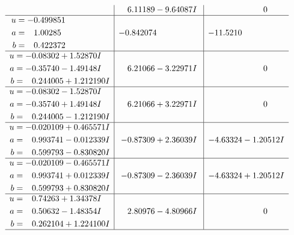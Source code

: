 \documentclass[1p]{elsarticle_modified}
\theoremstyle{definition}
\begin{document}
$$\begin{array}{c|c|c}
 & \phantom{-}6.11189 - 9.64087 I & \phantom{-0.000000 } 0 \\ \hline\begin{aligned}
u &= -0.499851\phantom{ +0.000000I} \\
a &= \phantom{-}1.00285\phantom{ +0.000000I} \\
b &= \phantom{-}0.422372\phantom{ +0.000000I}\end{aligned}
 & -0.842074\phantom{ +0.000000I} & -11.5210\phantom{ +0.000000I} \\ \hline\begin{aligned}
u &= -0.08302 + 1.52870 I \\
a &= -0.35740 - 1.49148 I \\
b &= \phantom{-}0.244005 + 1.212190 I\end{aligned}
 & \phantom{-}6.21066 - 3.22971 I & \phantom{-0.000000 } 0 \\ \hline\begin{aligned}
u &= -0.08302 - 1.52870 I \\
a &= -0.35740 + 1.49148 I \\
b &= \phantom{-}0.244005 - 1.212190 I\end{aligned}
 & \phantom{-}6.21066 + 3.22971 I & \phantom{-0.000000 } 0 \\ \hline\begin{aligned}
u &= -0.020109 + 0.465571 I \\
a &= \phantom{-}0.993741 - 0.012339 I \\
b &= \phantom{-}0.599793 - 0.830820 I\end{aligned}
 & -0.87309 + 2.36039 I & -4.63324 - 1.20512 I \\ \hline\begin{aligned}
u &= -0.020109 - 0.465571 I \\
a &= \phantom{-}0.993741 + 0.012339 I \\
b &= \phantom{-}0.599793 + 0.830820 I\end{aligned}
 & -0.87309 - 2.36039 I & -4.63324 + 1.20512 I \\ \hline\begin{aligned}
u &= \phantom{-}0.74263 + 1.34378 I \\
a &= \phantom{-}0.50632 - 1.48354 I \\
b &= \phantom{-}0.262104 + 1.224100 I\end{aligned}
 & \phantom{-}2.80976 - 4.80966 I & \phantom{-0.000000 } 0\\
 \hline 
 \end{array}$$\newpage$$\begin{array}{c|c|c}  

\end{array}$$
\end{document}
